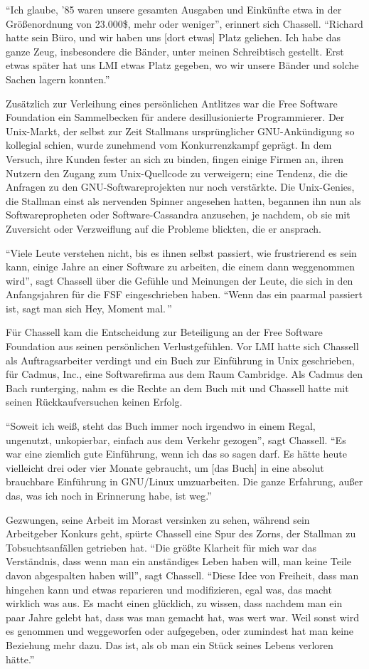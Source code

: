 "`Ich glaube, '85 waren unsere gesamten Ausgaben und Einkünfte etwa in der Größenordnung von 23.000\$, mehr oder weniger"', erinnert sich Chassell. "`Richard hatte sein Büro, und wir haben uns [dort etwas] Platz geliehen. Ich habe das ganze Zeug, insbesondere die Bänder, unter meinen Schreibtisch gestellt. Erst etwas später hat uns LMI etwas Platz gegeben, wo wir unsere Bänder und solche Sachen lagern konnten."'

Zusätzlich zur Verleihung eines persönlichen Antlitzes war die Free Software Foundation ein Sammelbecken für andere desillusionierte Programmierer. Der Unix-Markt, der selbst zur Zeit Stallmans ursprünglicher GNU-Ankündigung so kollegial schien, wurde zunehmend vom Konkurrenzkampf geprägt. In dem Versuch, ihre Kunden fester an sich zu binden, fingen einige Firmen an, ihren Nutzern den Zugang zum Unix-Quellcode zu verweigern; eine Tendenz, die die Anfragen zu den GNU-Softwareprojekten nur noch verstärkte. Die Unix-Genies, die Stallman einst als nervenden Spinner angesehen hatten, begannen ihn nun als Softwarepropheten oder Software-Cassandra anzusehen, je nachdem, ob sie mit Zuversicht oder Verzweiflung auf die Probleme blickten, die er ansprach.

"`Viele Leute verstehen nicht, bis es ihnen selbst passiert, wie frustrierend es sein kann, einige Jahre an einer Software zu arbeiten, die einem dann weggenommen wird"', sagt Chassell über die Gefühle und Meinungen der Leute, die sich in den Anfangsjahren für die FSF eingeschrieben haben. "`Wenn das ein paarmal passiert ist, sagt man sich \glq Hey, Moment mal.\grq\,"'

Für Chassell kam die Entscheidung zur Beteiligung an der Free Software Foundation aus seinen persönlichen Verlustgefühlen. Vor LMI hatte sich Chassell als Auftragsarbeiter verdingt und ein Buch zur Einführung in Unix geschrieben, für Cadmus, Inc., eine Softwarefirma aus dem Raum Cambridge. Als Cadmus den Bach runterging, nahm es die Rechte an dem Buch mit und Chassell hatte mit seinen Rückkaufversuchen keinen Erfolg.

"`Soweit ich weiß, steht das Buch immer noch irgendwo in einem Regal, ungenutzt, unkopierbar, einfach aus dem Verkehr gezogen"', sagt Chassell. "`Es war eine ziemlich gute Einführung, wenn ich das so sagen darf. Es hätte heute vielleicht drei oder vier Monate gebraucht, um [das Buch] in eine absolut brauchbare Einführung in GNU/Linux umzuarbeiten. Die ganze Erfahrung, außer das, was ich noch in Erinnerung habe, ist weg."'

Gezwungen, seine Arbeit im Morast versinken zu sehen, während sein Arbeitgeber Konkurs geht, spürte Chassell eine Spur des Zorns, der Stallman zu Tobsuchtsanfällen getrieben hat. "`Die größte Klarheit für mich war das Verständnis, dass wenn man ein anständiges Leben haben will, man keine Teile davon abgespalten haben will"', sagt Chassell.  "`Diese Idee von Freiheit, dass man hingehen kann und etwas reparieren und modifizieren, egal was, das macht wirklich was aus. Es macht einen glücklich, zu wissen, dass nachdem man ein paar Jahre gelebt hat, dass was man gemacht hat, was wert war. Weil sonst wird es genommen und weggeworfen oder aufgegeben, oder zumindest hat man keine Beziehung mehr dazu. Das ist, als ob man ein Stück seines Lebens verloren hätte."'
